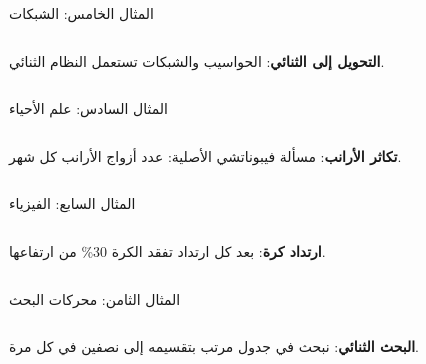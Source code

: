 \documentclass[aspectratio=169, 11pt, t, xcolor={table}]{beamer}
\begin{document}
\begin{frame}[t]{المثال الخامس: الشبكات}
    \begin{columns}[T]
        {\small \textbf{التحويل إلى الثنائي}: الحواسيب والشبكات تستعمل النظام الثنائي.\par}
        \vspace{0.3cm}
    \end{columns}
\end{frame}

\begin{frame}[t]{المثال السادس: علم الأحياء}
    \begin{columns}[T]
        {\small \textbf{تكاثر الأرانب}: مسألة فيبوناتشي الأصلية: عدد أزواج الأرانب كل شهر.\par}
        \vspace{0.3cm}
    \end{columns}
\end{frame}

\begin{frame}[t]{المثال السابع: الفيزياء}
    \begin{columns}[T]
        {\small \textbf{ارتداد كرة}: بعد كل ارتداد تفقد الكرة 30\% من ارتفاعها.\par}
        \vspace{0.3cm}
    \end{columns}
\end{frame}

\begin{frame}[t]{المثال الثامن: محركات البحث}
    \begin{columns}[T]
        {\small \textbf{البحث الثنائي}: نبحث في جدول مرتب بتقسيمه إلى نصفين في كل مرة.\par}
        \vspace{0.3cm}
    \end{columns}
\end{frame}
\end{document}
